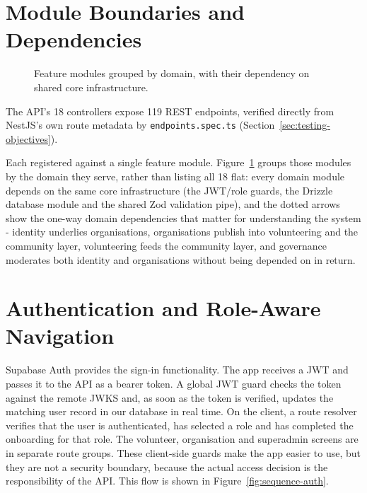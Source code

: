 \section{Module Boundaries and Dependencies}
\label{sec:modules}
\begin{figure}[H]
    \centering
    \caption{Feature modules grouped by domain, with their dependency on shared core infrastructure.}
    \label{fig:modules}
\end{figure}
The API's 18 controllers expose 119 REST endpoints, verified directly from NestJS's own route metadata by \texttt{endpoints.spec.ts} (Section~\ref{sec:testing-objectives}).

Each registered against a single feature module. Figure~\ref{fig:modules} groups those modules by the domain they serve, rather than listing all 18 flat: every domain module depends on the same core infrastructure (the JWT/role guards, the Drizzle database module and the shared Zod validation pipe), and the dotted arrows show the one-way domain dependencies that matter for understanding the system - identity underlies organisations, organisations publish into volunteering and the community layer, volunteering feeds the community layer, and governance moderates both identity and organisations without being depended on in return.



\section{Authentication and Role-Aware Navigation}
\label{sec:impl-auth}
Supabase Auth provides the sign-in functionality. The app receives a JWT and passes it to the API as a bearer token. A global JWT guard checks the token against the remote JWKS and, as soon as the token is verified, updates the matching user record in our database in real time. On the client, a route resolver verifies that the user is authenticated, has selected a role and has completed the onboarding for that role. The volunteer, organisation and superadmin screens are in separate route groups. These client-side guards make the app easier to use, but they are not a security boundary, because the actual access decision is the responsibility of the API. This flow is shown in Figure~\ref{fig:sequence-auth}.


